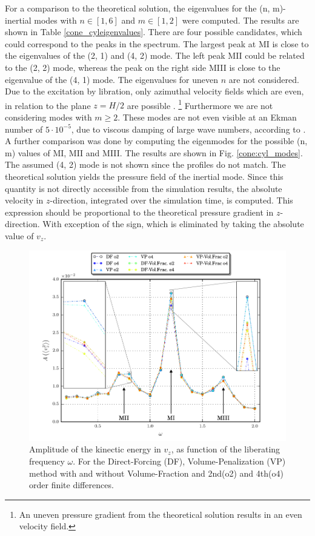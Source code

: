 For a comparison to the theoretical solution, the eigenvalues for the (n, m)-inertial modes with $n\in[1,6]$ and $m\in[1, 2]$ were computed.
The results are shown in Table \ref{cone_cyleigenvalues}.
There are four possible candidates,  which could correspond to the peaks in the spectrum.
The largest peak at M\RN{1} is close to the eigenvalues of the (2, 1) and (4, 2) mode.
The left peak  M\RN{2} could be related to the (2, 2) mode,  whereas the peak on the right side M\RN{3} is close to the eigenvalue of the (4, 1) mode.
The eigenvalues for uneven $n$ are not considered. Due to the excitation by libration,  only azimuthal velocity fields which are even,
in relation to the plane $z=H/2$ are possible \citep{Sauret2012}.
\footnote{An uneven pressure gradient from the theoretical solution results in an even velocity field.}
Furthermore we are not considering modes with $m\geq2$. These modes are not even visible at an Ekman number of $5\cdot10^{-5}$,
due to viscous damping of large wave numbers, according to \citep{Sauret2012}.\\
A further comparison was done by computing the eigenmodes for the possible (n, m) values of M\RN{1}, M\RN{2} and M\RN{3}.
The results are shown in Fig. \ref{cone:cyl_modes}.
The assumed (4, 2) mode is not shown since the profiles do not match.
The theoretical solution yields the pressure field of the inertial mode.
Since this quantity is not directly accessible from the simulation results,
the absolute velocity in $z$-direction, integrated over the simulation time, is computed.
This expression should be proportional to the theoretical pressure gradient in $z$-direction.
With exception of the sign, which is eliminated by taking the absolute value of $v_z$.
\clearpage
\begin{figure}[!t]
  \centering
  \includegraphics{gfx/cone/cylinder/cylinder.pdf}  \caption{\label{fig:cone:cyl}
    Amplitude of the kinectic energy in $v_z$, as function of the liberating frequency $\omega$.
   For the Direct-Forcing (DF), Volume-Penalization (VP) method with and without Volume-Fraction and
      2nd(o2)  and 4th(o4) order finite differences.}
\end{figure}

